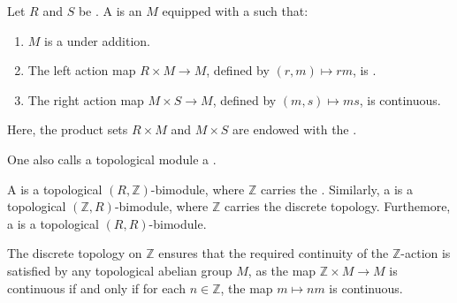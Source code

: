 \begin{definition} \label{definition:topological_module_over_topological_rings}
Let $R$ and $S$ be . 
A  is an  $M$ equipped with a  such that:
\begin{enumerate}
    \item $M$ is a  under addition.
    \item The left action map $R \times M \to M$, defined by $(r, m) \mapsto rm$, is .
    \item The right action map $M \times S \to M$, defined by $(m, s) \mapsto ms$, is continuous.
\end{enumerate}
Here, the product sets $R \times M$ and $M \times S$ are endowed with the .

One also calls a topological module a .


A  is a topological $(R, \mathbb{Z})$-bimodule, where $\mathbb{Z}$ carries the .  Similarly, a  is a topological $(\mathbb{Z}, R)$-bimodule, where $\mathbb{Z}$ carries the discrete topology. Furthemore, a  is a topological $(R, R)$-bimodule.

The discrete topology on $\mathbb{Z}$ ensures that the required continuity of the $\mathbb{Z}$-action is satisfied by any topological abelian group $M$, as the map $\mathbb{Z} \times M \to M$ is continuous if and only if for each $n \in \mathbb{Z}$, the map $m \mapsto nm$ is continuous.
\end{definition}